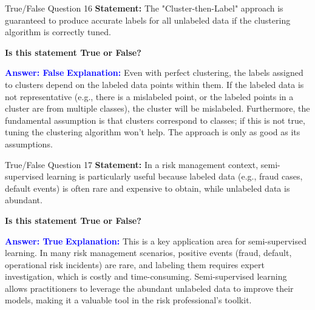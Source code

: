 \documentclass[8pt]{beamer}  %
\begin{document}
	\begin{frame}{True/False Question 16}
		\textbf{Statement:} The "Cluster-then-Label" approach is guaranteed to produce accurate labels for all unlabeled data if the clustering algorithm is correctly tuned.
		
		\vspace{0.3cm}
		\textbf{Is this statement True or False?}
		
		\vspace{0.2cm}
		\textcolor{blue}{\textbf{Answer: False}}
		\vspace{0.2cm}
		\textcolor{blue}{\textbf{Explanation:}} Even with perfect clustering, the labels assigned to clusters depend on the labeled data points within them. If the labeled data is not representative (e.g., there is a mislabeled point, or the labeled points in a cluster are from multiple classes), the cluster will be mislabeled. Furthermore, the fundamental assumption is that clusters correspond to classes; if this is not true, tuning the clustering algorithm won't help. The approach is only as good as its assumptions.
	\end{frame}
	
	\begin{frame}{True/False Question 17}
		\textbf{Statement:} In a risk management context, semi-supervised learning is particularly useful because labeled data (e.g., fraud cases, default events) is often rare and expensive to obtain, while unlabeled data is abundant.
		
		\vspace{0.3cm}
		\textbf{Is this statement True or False?}
		
		\vspace{0.2cm}
		\textcolor{blue}{\textbf{Answer: True}}
		\vspace{0.2cm}
		\textcolor{blue}{\textbf{Explanation:}} This is a key application area for semi-supervised learning. In many risk management scenarios, positive events (fraud, default, operational risk incidents) are rare, and labeling them requires expert investigation, which is costly and time-consuming. Semi-supervised learning allows practitioners to leverage the abundant unlabeled data to improve their models, making it a valuable tool in the risk professional's toolkit.
	\end{frame}
	
\end{document}
